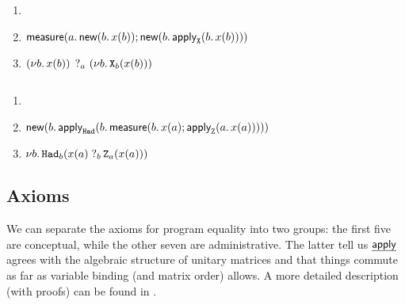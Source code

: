 \documentclass[a4paper]{article}
\begin{document}

\begin{example}\(\)
    \begin{enumerate}
        \item {}
        \item \( \tmeasure{a}{\tnew{b}{x{\p b}}}{\tnew{b}{\tapply{X}{b}{x{\p b}}}} \)
        \item \(
            \measure{a}
                {\new{b}              {x{\p b}}}
                {\new{b} {\apply{X}{b}{x{\p b}}}
            }\)
    \end{enumerate}
\end{example}

\begin{example}\(\)
    \begin{enumerate}
        \item {}
        \item \( \tnew{b}{\tapply{\had}{b}{\tmeasure{b}{x{\p a}}{\tapply{Z}{a}{x{\p a}}}}} \)
        \item \(
            \new{b}{ \apply{\had}{b}{
                \measureraw{b}
                    {x{\p a}}
                    {\apply{Z}{a}{x{\p a}}}
            }}\)
    \end{enumerate}
\end{example}

\subsection{Axioms}

We can separate the axioms for program equality into two groups: the first five are conceptual, while the other seven are administrative.
The latter tell us \(\eff{apply}\) agrees with the algebraic structure of unitary matrices and that things commute as far as variable binding (and matrix order) allows. A more detailed description (with proofs) can be found in \cite{algeff-lin-qpl}.

\end{document}
